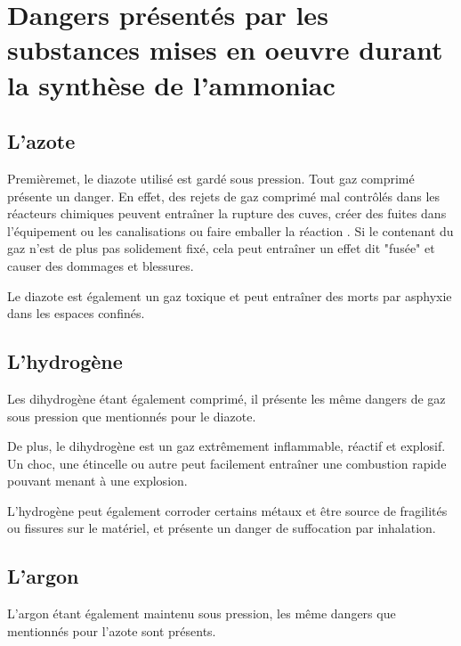 

\section{Dangers présentés par les substances mises en oeuvre durant la synthèse de l'ammoniac}
\subsection{L'azote}
Premièremet, le diazote utilisé est gardé sous pression. Tout gaz comprimé présente un danger. 
En effet, des rejets de gaz comprimé mal contrôlés dans les réacteurs chimiques peuvent entraîner 
la rupture des cuves, créer des fuites dans l'équipement ou les canalisations ou faire emballer la réaction \cite{canada}.
Si le contenant du gaz n'est de plus pas solidement fixé, cela peut entraîner un effet dit "fusée" 
et causer des dommages et blessures.

Le diazote est également un gaz toxique et peut entraîner des morts par asphyxie dans les espaces confinés. 

\subsection{L'hydrogène}
Les dihydrogène étant également comprimé, il présente les même dangers de gaz sous 
pression que mentionnés pour le diazote.

De plus, le dihydrogène est un gaz extrêmement inflammable, réactif et explosif. 
Un choc, une étincelle ou autre peut facilement 
entraîner une combustion rapide pouvant menant à une explosion.

L'hydrogène peut également corroder certains métaux et être source de fragilités
ou fissures sur le matériel, et présente un danger de suffocation par inhalation.

\subsection{L'argon}
L'argon étant également maintenu sous pression, les même dangers que mentionnés
pour l'azote sont présents.

